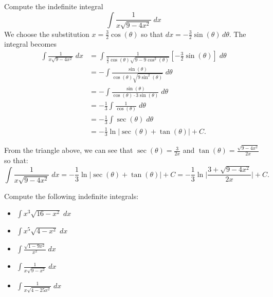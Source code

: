 \documentclass{ximera}
\begin{document}
\begin{example}
Compute the indefinite integral
\[
\int \frac{1}{x\sqrt{9-4x^2}} \; dx
\]
We choose the substitution $x = \frac32\cos(\theta)$ so that $dx = -\frac32\sin(\theta) \, d\theta$.
The integral becomes
\begin{align*}
\int \frac{1}{x\sqrt{9-4x^2}}\; dx &= \int \frac{1}{\frac32\cos(\theta)\sqrt{9-9\cos^2(\theta)}} \left[-\frac32\sin(\theta)\right]\; d\theta\\
                                  &= -\int \frac{\sin(\theta)}{\cos(\theta)\sqrt{9\sin^2(\theta)}}   \; d\theta\\
                                 &= -\int \frac{\sin(\theta)}{\cos(\theta)\cdot 3\sin(\theta)}   \; d\theta\\
                                  &= -\frac13\int \frac{1}{\cos(\theta)}  \; d\theta\\
                                  &= -\frac13\int \sec(\theta) \; d\theta\\                                 
                                 &= -\frac13 \ln|\sec(\theta) + \tan(\theta)| + C.  
\end{align*}

From the triangle above, we can see that $\sec(\theta) = \frac{3}{2x}$ and $\tan(\theta) = \frac{\sqrt{9-4x^2}}{2x}$ so that:
\[
\int \frac{1}{x\sqrt{9-4x^2}} \; dx = -\frac13 \ln|\sec(\theta) + \tan(\theta)| + C = 
 - \frac13\ln\bigg|\frac{3 + \sqrt{9-4x^2}}{2x}\bigg| + C.  
\]

\end{example}


\begin{problem}
Compute the following indefinite integrals:
\begin{itemize}
\item $\displaystyle{\int   x^3 \sqrt{16-x^2} \; dx}$
\item $\displaystyle{\int   x^5 \sqrt{4-x^2} \; dx}$
\item $\displaystyle{\int \frac{\sqrt{1-9x^2}}{x^2}\; dx}$
\item $\displaystyle{\int \frac{1}{x\sqrt{9-x^2}} \; dx}$
\item $\displaystyle{\int \frac{1}{x\sqrt{4-25x^2}} \; dx}$
\end{itemize}

\end{problem}
\end{document}

